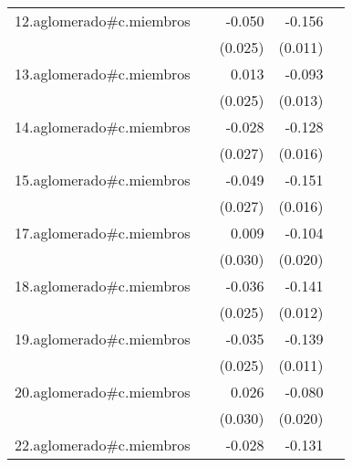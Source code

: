 {\begin{longtable}{l*{4}{D{.}{.}{-1}}}
\addlinespace
12.aglomerado#c.miembros&                     &      -0.050\sym{*}  &      -0.156\sym{***}&                     \\
            &                     &     (0.025)         &     (0.011)         &                     \\
\addlinespace
13.aglomerado#c.miembros&                     &       0.013         &      -0.093\sym{***}&                     \\
            &                     &     (0.025)         &     (0.013)         &                     \\
\addlinespace
14.aglomerado#c.miembros&                     &      -0.028         &      -0.128\sym{***}&                     \\
            &                     &     (0.027)         &     (0.016)         &                     \\
\addlinespace
15.aglomerado#c.miembros&                     &      -0.049         &      -0.151\sym{***}&                     \\
            &                     &     (0.027)         &     (0.016)         &                     \\
\addlinespace
17.aglomerado#c.miembros&                     &       0.009         &      -0.104\sym{***}&                     \\
            &                     &     (0.030)         &     (0.020)         &                     \\
\addlinespace
18.aglomerado#c.miembros&                     &      -0.036         &      -0.141\sym{***}&                     \\
            &                     &     (0.025)         &     (0.012)         &                     \\
\addlinespace
19.aglomerado#c.miembros&                     &      -0.035         &      -0.139\sym{***}&                     \\
            &                     &     (0.025)         &     (0.011)         &                     \\
\addlinespace
20.aglomerado#c.miembros&                     &       0.026         &      -0.080\sym{***}&                     \\
            &                     &     (0.030)         &     (0.020)         &                     \\
\addlinespace
22.aglomerado#c.miembros&                     &      -0.028         &      -0.131\sym{***}&                     \\

\end{longtable}}
